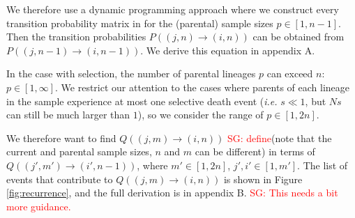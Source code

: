 \documentclass[review]{elsarticle}
\newcommand{\ra}{\rightarrow}
\newcommand{\sgcomment}[1]{\textcolor{red}{SG: #1}}
\begin{document}

We therefore use a dynamic programming approach where
we construct every transition probability matrix in for the (parental) sample sizes $p \in [1,n-1]$.
Then the transition probabilities $P((j,n)\ra(i,n))$ can be obtained from $P((j,n-1)\ra(i,n-1))$.
We derive this equation in appendix A.

In the case with selection, the number of parental lineages $p$ can exceed $n$: $p\in[1, \infty]$.
We restrict our attention to the cases where parents of each lineage in the sample experience at
most one selective death event (\textit{i.e.} $s \ll 1$, but $Ns$ can still be much larger than $1$), so we consider the range of $p \in [1, 2n]$.


We therefore want to find $Q((j,m)\ra(i,n))$ \sgcomment{define}(note that the current and parental sample sizes, $n$
and $m$ can be different) in terms of $Q((j',m')\ra(i',n-1))$, where $m' \in [1, 2n]$, $j',i' \in
[1, m']$. The list of events that contribute to $Q((j,m)\ra(i,n))$ is shown in Figure
\ref{fig:recurrence}, and the full derivation is in appendix B. \sgcomment{This needs a bit more guidance.}
\end{document}
